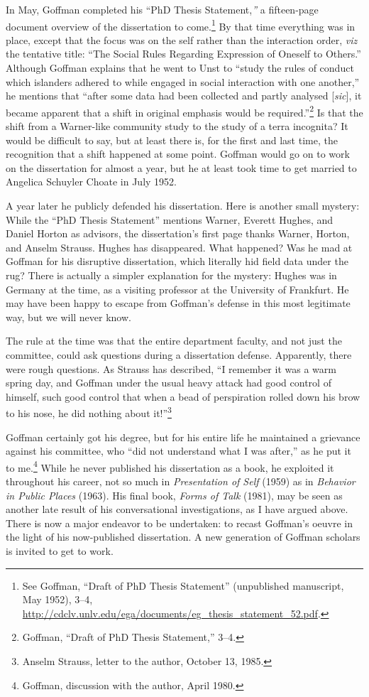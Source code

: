 \documentclass[openany,nobib]{tufte-book}
\begin{document}
In May, Goffman completed his ``PhD Thesis Statement,\emph{''} a
fifteen-page document overview of the dissertation to come.\footnote{See
  Goffman, ``Draft of PhD Thesis Statement'' (unpublished manuscript,
  May 1952), 3--4,
  \url{http://cdclv.unlv.edu/ega/documents/eg_thesis_statement_52.pdf}.}
By that time everything was in place, except that the focus was on the
self rather than the interaction order, \emph{viz} the tentative title:
``The Social Rules Regarding Expression of Oneself to Others.'' Although
Goffman explains that he went to Unst to ``study the rules of conduct
which islanders adhered to while engaged in social interaction with one
another,'' he mentions that ``after some data had been collected and
partly analysed {[}\emph{sic}{]}, it became apparent that a shift in
original emphasis would be required.''\footnote{Goffman, ``Draft of PhD
  Thesis Statement,'' 3--4.} Is that the shift from a Warner-like
community study to the study of a terra incognita? It would be difficult
to say, but at least there is, for the first and last time, the
recognition that a shift happened at some point. Goffman would go on to
work on the dissertation for almost a year, but he at least took time to
get married to Angelica Schuyler Choate in July 1952.

A year later he publicly defended his dissertation. Here is another
small mystery: While the ``PhD Thesis Statement'' mentions Warner,
Everett Hughes, and Daniel Horton as advisors, the dissertation's first
page thanks Warner, Horton, and Anselm Strauss. Hughes has disappeared.
What happened? Was he mad at Goffman for his disruptive dissertation,
which literally hid field data under the rug? There is actually a
simpler explanation for the mystery: Hughes was in Germany at the time,
as a visiting professor at the University of Frankfurt. He may have been
happy to escape from Goffman's defense in this most legitimate way, but
we will never know.

The rule at the time was that the entire department faculty, and not
just the committee, could ask questions during a dissertation defense.
Apparently, there were rough questions. As Strauss has described, ``I
remember it was a warm spring day, and Goffman under the usual heavy
attack had good control of himself, such good control that when a bead
of perspiration rolled down his brow to his nose, he did nothing about
it!''\footnote{Anselm Strauss, letter to the author, October 13, 1985.}

Goffman certainly got his degree, but for his entire life he maintained
a grievance against his committee, who ``did not understand what I was
after,'' as he put it to me.\footnote{Goffman, discussion with the
  author, April 1980.} While he never published his dissertation as a
book, he exploited it throughout his career, not so much in
\emph{Presentation of Self} (1959) as in \emph{Behavior in Public
Places} (1963). His final book, \emph{Forms of Talk} (1981), may be seen
as another late result of his conversational investigations, as I have
argued above. There is now a major endeavor to be undertaken: to recast
Goffman's oeuvre in the light of his now-published dissertation. A new
generation of Goffman scholars is invited to get to work.
\end{document}

